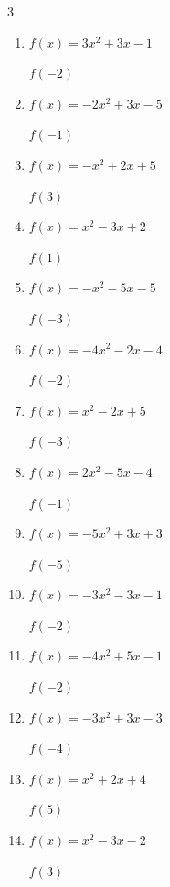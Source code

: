 \begin{multicols}{3}
\begin{enumerate}
  \item $f(x)=3x^{2}+3x-1$

$f(-2)$
        \phantom{$= 5$}

  \item $f(x)=-2x^{2}+3x-5$

$f(-1)$
        \phantom{$= -10$}

  \item $f(x)=-x^{2}+2x+5$

$f(3)$
        \phantom{$= 2$}

  \item $f(x)=x^{2}-3x+2$

$f(1)$
        \phantom{$= 0$}

  \item $f(x)=-x^{2}-5x-5$

$f(-3)$
        \phantom{$= 1$}

\columnbreak %

\resetques

  \item $f(x)=-4x^{2}-2x-4$

$f(-2)$
        \phantom{$= -16$}

  \item $f(x)=x^{2}-2x+5$

$f(-3)$
        \phantom{$= 20$}

  \item $f(x)=2x^{2}-5x-4$

$f(-1)$
        \phantom{$= 3$}

  \item $f(x)=-5x^{2}+3x+3$

$f(-5)$
        \phantom{$= -137$}

  \item $f(x)=-3x^{2}-3x-1$

$f(-2)$
        \phantom{$= -7$}

  \item $f(x)=-4x^{2}+5x-1$

$f(-2)$
        \phantom{$= -27$}

  \item $f(x)=-3x^{2}+3x-3$

$f(-4)$
        \phantom{$= -63$}

  \item $f(x)=x^{2}+2x+4$

$f(5)$
        \phantom{$= 39$}

  \item $f(x)=x^{2}-3x-2$

$f(3)$
        \phantom{$= -2$}


\end{enumerate}
\end{multicols}
